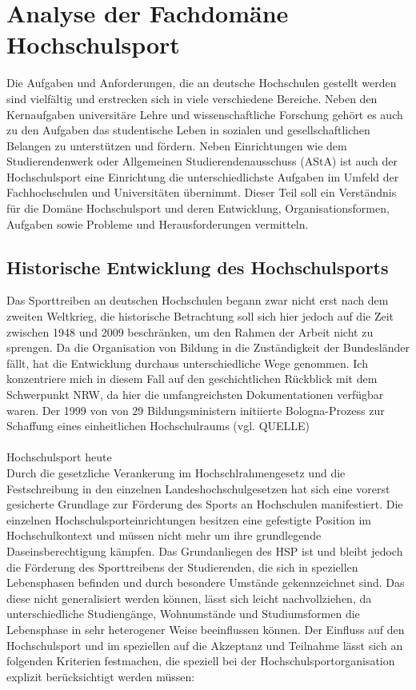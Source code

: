 \chapter{Analyse der Fachdomäne Hochschulsport} 
\label{ch:hochschulsport} 
Die Aufgaben und Anforderungen, die an deutsche Hochschulen gestellt werden sind vielfältig und erstrecken sich in viele verschiedene Bereiche. Neben den Kernaufgaben universitäre Lehre und wissenschaftliche Forschung gehört es auch zu den Aufgaben das studentische Leben in sozialen und gesellschaftlichen Belangen zu unterstützen und fördern. Neben Einrichtungen wie dem Studierendenwerk oder Allgemeinen Studierendenausschuss (AStA) ist auch der Hochschulsport eine Einrichtung die unterschiedlichste Aufgaben im Umfeld der Fachhochschulen und Universitäten übernimmt. Dieser Teil soll ein Verständnis für die Domäne Hochschulsport und deren Entwicklung, Organisationsformen, Aufgaben sowie Probleme und Herausforderungen vermitteln.

\section{Historische Entwicklung des Hochschulsports}
Das Sporttreiben an deutschen Hochschulen begann zwar nicht erst nach dem zweiten Weltkrieg, die historische Betrachtung soll sich hier jedoch auf die Zeit zwischen 1948 und 2009 beschränken, um den Rahmen der Arbeit nicht zu sprengen. Da die Organisation von Bildung in die Zuständigkeit der Bundesländer fällt, hat die Entwicklung durchaus unterschiedliche Wege genommen. Ich konzentriere mich in diesem Fall auf den geschichtlichen Rückblick mit dem Schwerpunkt NRW, da hier die umfangreichsten Dokumentationen verfügbar waren. 
Der 1999 von von 29 Bildungsministern initiierte Bologna-Prozess zur Schaffung eines einheitlichen Hochschulraums (vgl. QUELLE)
\\ \\

Hochschulsport heute\\
Durch die gesetzliche Verankerung im Hochschlrahmengesetz und die Festschreibung in den einzelnen Landeshochschulgesetzen hat sich eine vorerst gesicherte Grundlage zur Förderung des Sports an Hochschulen manifestiert. Die einzelnen Hochschulsporteinrichtungen besitzen eine gefestigte Position im Hochschulkontext und müssen nicht mehr um ihre grundlegende Daseinsberechtigung kämpfen. 
Das Grundanliegen des HSP ist und bleibt jedoch die Förderung des Sporttreibens der Studierenden, die sich in speziellen Lebensphasen befinden und durch besondere Umstände gekennzeichnet sind. Das diese nicht generalisiert werden können, lässt sich leicht nachvollziehen, da unterschiedliche Studiengänge, Wohnumstände und Studiumsformen die Lebensphase in sehr heterogener Weise beeinflussen können. Der Einfluss auf den Hochschulsport und im speziellen auf die Akzeptanz und Teilnahme lässt sich an folgenden Kriterien festmachen, die speziell bei der Hochschulsportorganisation explizit berücksichtigt werden müssen:

